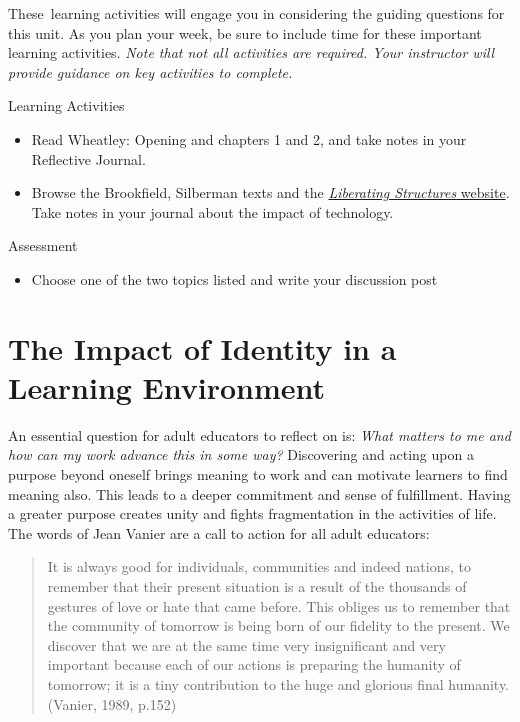 \documentclass[
]{book}
\providecommand{\tightlist}{%
  \setlength{\itemsep}{0pt}\setlength{\parskip}{0pt}}
\begin{document}
These~learning activities will engage you in considering the guiding questions for this unit. As you plan your week, be sure to include time for these important learning activities. \emph{Note that not all activities are required. Your instructor will provide guidance on key activities to complete.}

\begin{reflect}
{Learning Activities}

\begin{itemize}
\tightlist
\item
  Read Wheatley: Opening and chapters 1 and 2, and take notes in your
  Reflective Journal.\\
\item
  Browse the Brookfield, Silberman texts and the
  \href{http://www.liberatingstructures.com/ls-menu/}{\emph{Liberating
  Structures} website}. Take notes in your journal about the impact of
  technology.
\end{itemize}
\end{reflect}

\begin{assessment}
{Assessment}

\begin{itemize}
\tightlist
\item
  Choose one of the two topics listed and write your discussion post
\end{itemize}
\end{assessment}

\hypertarget{the-impact-of-identity-in-a-learning-environment}{%
\section{The Impact of Identity in a Learning Environment}\label{the-impact-of-identity-in-a-learning-environment}}

An essential question for adult educators to reflect on is: \emph{What matters to me and how can my work advance this in some way?} Discovering and acting upon a purpose beyond oneself brings meaning to work and can motivate learners to find meaning also. This leads to a deeper commitment and sense of fulfillment. Having a greater purpose creates unity and fights fragmentation in the activities of life. The words of Jean Vanier are a call to action for all adult educators:

\begin{quote}
It is always good for individuals, communities and indeed nations, to remember that their present situation is a result of the thousands of gestures of love or hate that came before. This obliges us to remember that the community of tomorrow is being born of our fidelity to the present. We discover that we are at the same time very insignificant and very important because each of our actions is preparing the humanity of tomorrow; it is a tiny contribution to the huge and glorious final humanity. (Vanier, 1989, p.152)
\end{quote}
\end{document}
